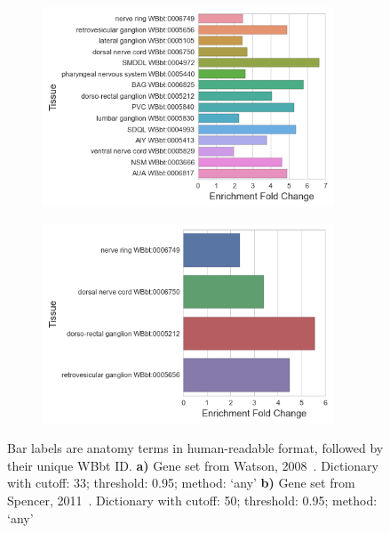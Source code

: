 \documentclass{bmcart}
\begin{document}
\begin{backmatter}
\begin{figure}
  \begin{subfigure}[b]{0.95\textwidth}
    \includegraphics[width=0.95\textwidth]{WBPaper00024970_GABAergic_neuron_specific_WBbt_0005190_247_33cutoff.png}
    \caption{}
    \label{fig:agreement1}
  \end{subfigure}
  \begin{subfigure}[b]{0.95\textwidth} 	\includegraphics[width=0.95\textwidth]{WBPaper00037950_GABAergic-motor-neurons_larva_enriched_WBbt_0005190_132_33cutoff.png}
    \caption{}
    \label{fig:agreement2}
  \end{subfigure}
  \captionsetup{width= 0.95\textwidth}
  \caption{
  Bar labels are anatomy terms in human-readable format, followed by their unique WBbt ID.
  \textbf{a)} Gene set from Watson, 2008~\cite{Watson2008a}. Dictionary with cutoff: 33; threshold: 0.95; method: `any'
  \textbf{b)} Gene set from Spencer, 2011~\cite{Spencer2011}. Dictionary with cutoff: 50; threshold: 0.95; method: `any'
   }
   \label{fig:intragree}
\end{figure}



\end{backmatter}
\end{document}
